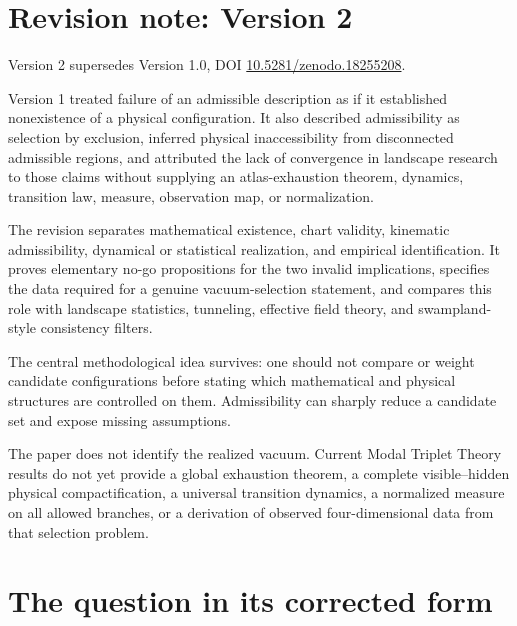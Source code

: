 \documentclass[11pt]{article}
\theoremstyle{definition}
\theoremstyle{remark}
\newcommand{\1}{\mathbf 1}
\newcommand{\MTT}{Modal Triplet Theory}
\begin{document}
\section*{Revision note: Version 2}
\begin{description}[leftmargin=2.5cm,style=nextline]
\item[Supersedes]
Version 2 supersedes Version 1.0, DOI
\href{https://doi.org/10.5281/zenodo.18255208}
{10.5281/zenodo.18255208}.

\item[Reason]
Version 1 treated failure of an admissible description as if it established
nonexistence of a physical configuration.  It also described admissibility
as selection by exclusion, inferred physical inaccessibility from
disconnected admissible regions, and attributed the lack of convergence in
landscape research to those claims without supplying an atlas-exhaustion
theorem, dynamics, transition law, measure, observation map, or
normalization.

\item[Resolution]
The revision separates mathematical existence, chart validity, kinematic
admissibility, dynamical or statistical realization, and empirical
identification.  It proves elementary no-go propositions for the two invalid
implications, specifies the data required for a genuine vacuum-selection
statement, and compares this role with landscape statistics, tunneling,
effective field theory, and swampland-style consistency filters.

\item[Retained content]
The central methodological idea survives: one should not compare or weight
candidate configurations before stating which mathematical and physical
structures are controlled on them.  Admissibility can sharply reduce a
candidate set and expose missing assumptions.

\item[Remaining boundary]
The paper does not identify the realized vacuum.  Current \MTT{} results do
not yet provide a global exhaustion theorem, a complete visible--hidden
physical compactification, a universal transition dynamics, a normalized
measure on all allowed branches, or a derivation of observed
four-dimensional data from that selection problem.
\end{description}

\tableofcontents

\section{The question in its corrected form}
\label{sec:question}
\end{document}
